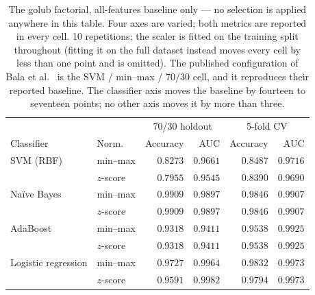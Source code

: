 \begin{table}[htbp]
    \centering
    \small\setlength{\tabcolsep}{5pt}
    \begin{tabular}{llrrrr}
    \hline
    & & \multicolumn{2}{c}{70/30 holdout} & \multicolumn{2}{c}{5-fold CV} \\
    Classifier & Norm. & Accuracy & AUC & Accuracy & AUC \\
    \hline
    SVM (RBF) & min--max & $0.8273$ & $0.9661$ & $0.8487$ & $0.9716$ \\
     & $z$-score & $0.7955$ & $0.9545$ & $0.8390$ & $0.9690$ \\
    \hline
    Na\"ive Bayes & min--max & $0.9909$ & $0.9897$ & $0.9846$ & $0.9907$ \\
     & $z$-score & $0.9909$ & $0.9897$ & $0.9846$ & $0.9907$ \\
    \hline
    AdaBoost & min--max & $0.9318$ & $0.9411$ & $0.9538$ & $0.9925$ \\
     & $z$-score & $0.9318$ & $0.9411$ & $0.9538$ & $0.9925$ \\
    \hline
    Logistic regression & min--max & $0.9727$ & $0.9964$ & $0.9832$ & $0.9973$ \\
     & $z$-score & $0.9591$ & $0.9982$ & $0.9794$ & $0.9973$ \\
    \hline
    \end{tabular}
    \caption{The golub factorial, all-features baseline only --- no selection is applied anywhere in this table. Four axes are varied; both metrics are reported in every cell. 10 repetitions; the scaler is fitted on the training split throughout (fitting it on the full dataset instead moves every cell by less than one point and is omitted). The published configuration of Bala et al.~\cite{bala2025orpsoc} is the SVM / min--max / 70/30 cell, and it reproduces their reported baseline. The classifier axis moves the baseline by fourteen to seventeen points; no other axis moves it by more than three.}
    \label{tab:golubfactorial}
\end{table}
